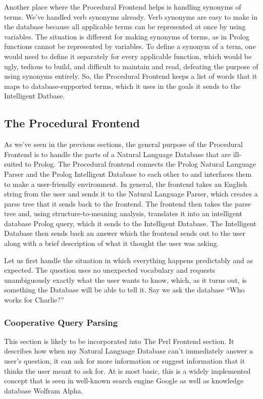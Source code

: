 \documentclass[12pt]{article}
\begin{document}
Another place where the Procedural Frontend helps is handling synonyms of terms. We've handled verb synonyms already. Verb synonyms are easy to make in the database because all applicable terms can be represented at once by using variables. The situation is different for making synonyms of terms, as in Prolog functions cannot be represented by variables. To define a synonym of a term, one would need to define it separately for every applicable function, which would be ugly, tedious to build, and difficult to maintain and read, defeating the purpose of using synonyms entirely. So, the Procedural Frontend keeps a list of words that it maps to database-supported terms, which it uses in the goals it sends to the Intelligent Datbase.

\subsection*{The Procedural Frontend}

As we've seen in the previous sections, the general purpose of the Procedural Frontend is to handle the parts of a Natural Language Database that are ill-suited to Prolog. The Procedural frontend connects the Prolog Natural Language Parser and the Prolog Intelligent Database to each other to and interfaces them to make a user-friendly environment. In general, the frontend takes an English string from the user and sends it to the Natural Language Parser, which creates a parse tree that it sends back to the frontend. The frontend then takes the parse tree and, using structure-to-meaning analysis, translates it into an intelligent database Prolog query, which it sends to the Intelligent Database. The Intelligent Database then sends back an answer which the frontend sends out to the user along with a brief description of what it thought the user was asking.

Let us first handle the situation in which everything happens predictably and as expected. The question uses no unexpected vocabulary and requests unambiguously exactly what the user wants to know, which, as it turns out, is something the Database will be able to tell it. Say we ask the database ``Who works for Charlie?''

\subsubsection*{Cooperative Query Parsing}

This section is likely to be incorporated into The Perl Frontend section. It describes how when my Natural Language Database can't immediately answer a user's question, it can ask for more information or suggest information that it thinks the user meant to ask for. At is most basic, this is a widely implemented concept that is seen in well-known search engine Google as well as knowledge database Wolfram Alpha.
\end{document}
